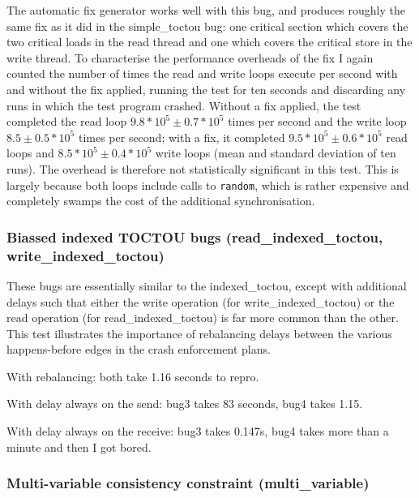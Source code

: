 The automatic fix generator works well with this bug, and produces
roughly the same fix as it did in the simple\_toctou bug: one critical
section which covers the two critical loads in the read thread and one
which covers the critical store in the write thread.  To characterise
the performance overheads of the fix I again counted the number of
times the read and write loops execute per second with and without the
fix applied, running the test for ten seconds and discarding any runs
in which the test program crashed.  Without a fix applied, the test
completed the read loop $9.8 * 10^5 \pm 0.7 * 10^5$ times per second
and the write loop $8.5 \pm 0.5 * 10^5$ times per second; with a fix,
it completed $9.5 * 10^5 \pm 0.6 * 10^5$ read loops and $8.5 * 10^5
\pm 0.4 * 10^5$ write loops (mean and standard deviation of ten runs).
The overhead is therefore not statistically significant in this test.
This is largely because both loops include calls to \verb|random|,
which is rather expensive and completely swamps the cost of the
additional synchronisation.


\subsubsection{Biassed indexed TOCTOU bugs (read\_indexed\_toctou, write\_indexed\_toctou)}

These bugs are essentially similar to the indexed\_toctou, except with
additional delays such that either the write operation (for
write\_indexed\_toctou) or the read operation (for
read\_indexed\_toctou) is far more common than the other.  This test
illustrates the importance of rebalancing delays between the various
happens-before edges in the crash enforcement plans.

With rebalancing: both take 1.16 seconds to repro.

With delay always on the send: bug3 takes 83 seconds, bug4 takes 1.15.

With delay always on the receive: bug3 takes 0.147s, bug4 takes more
than a minute and then I got bored.


\subsubsection{Multi-variable consistency constraint (multi\_variable)}

